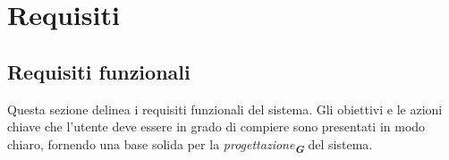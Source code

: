

\section{Requisiti}
\label{sec:Requisiti}   

\subsection{Requisiti funzionali}
\label{sec:requisiti_funzionali}
Questa sezione delinea i requisiti funzionali del sistema. Gli obiettivi e le azioni chiave che
l'utente deve essere in grado di compiere sono presentati in modo chiaro, fornendo una base
solida per la \emph{progettazione}\textsubscript{\textit{\textbf{G}}} del sistema.
